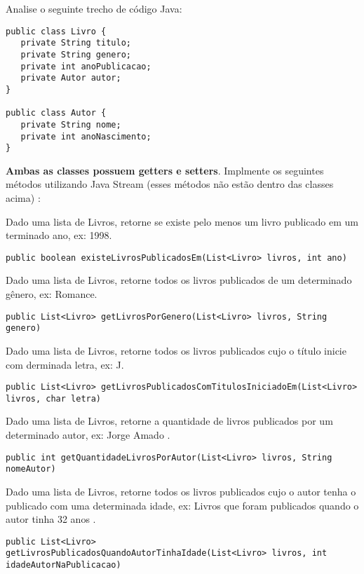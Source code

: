 \documentclass{lib/eng_softdoc}
\begin{document}
\makeheader

\problem Analise o seguinte trecho de código Java:

\begin{lstlisting}
public class Livro {
   private String titulo;
   private String genero;
   private int anoPublicacao;
   private Autor autor;
}

public class Autor {
   private String nome;
   private int anoNascimento;
}
\end{lstlisting}

\textbf{Ambas as classes possuem getters e setters}. Implmente os seguintes métodos utilizando Java Stream (esses métodos não estão dentro das classes acima) :

\subproblem Dado uma lista de Livros, retorne se existe pelo menos um livro publicado em um terminado ano, ex: 1998.
\begin{lstlisting}
public boolean existeLivrosPublicadosEm(List<Livro> livros, int ano)
\end{lstlisting}
\vspace*{2cm}

\subproblem Dado uma lista de Livros, retorne todos os livros publicados de um determinado gênero, ex: Romance.
\begin{lstlisting}
public List<Livro> getLivrosPorGenero(List<Livro> livros, String genero)
\end{lstlisting}
\vspace*{2cm}


\subproblem Dado uma lista de Livros, retorne todos os livros publicados cujo o título inicie com derminada letra, ex: J.
\begin{lstlisting}
public List<Livro> getLivrosPublicadosComTitulosIniciadoEm(List<Livro> livros, char letra)
\end{lstlisting}
\vspace*{2cm}

\subproblem Dado uma lista de Livros, retorne a quantidade de livros publicados por um determinado autor, ex: Jorge Amado .
\begin{lstlisting}
public int getQuantidadeLivrosPorAutor(List<Livro> livros, String nomeAutor)
\end{lstlisting}
\vspace*{2cm}

\subproblem Dado uma lista de Livros, retorne todos os livros publicados cujo o autor tenha o publicado com uma determinada idade, ex: Livros que foram publicados quando o autor tinha 32 anos .
\begin{lstlisting}
public List<Livro> getLivrosPublicadosQuandoAutorTinhaIdade(List<Livro> livros, int idadeAutorNaPublicacao)
\end{lstlisting}
\end{document}
